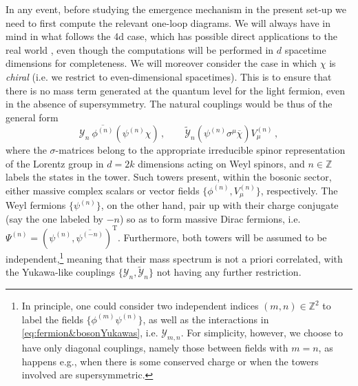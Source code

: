 In any event, before studying the emergence mechanism in the present set-up we need to first compute the relevant one-loop diagrams. We will always have in mind in what follows the 4d case, which has possible direct applications to the real world \cite{Castellano:2023qhp}, even though the computations will be performed in $d$ spacetime dimensions for completeness. We will moreover consider the case in which $\chi$ is \emph{chiral} (i.e. we restrict to even-dimensional spacetimes). This is to ensure that there is no mass term generated at the quantum level for the light fermion, even in the absence of supersymmetry. The natural couplings would be thus of the general form
%
\begin{equation}\label{eq:fermion&bosonYukawas}
		\mathcal{Y}_n\ \overline{\phi^{(n)}} \left(\psi^{(n)}\chi \right)\, , \qquad  \tilde{\mathcal{Y}}_n \left(\psi^{(n)} \sigma^{\mu} \overline \chi \right) V_{\mu}^{(n)}\, ,   
\end{equation}
%
where the $\sigma$-matrices belong to the appropriate irreducible spinor representation of the Lorentz group in $d=2k$ dimensions acting on Weyl spinors, and $n \in \mathbb{Z}$ labels the states in the tower. Such towers present, within the bosonic sector, either massive complex scalars or vector fields $\{\phi^{(n)}, V_{\mu}^{(n)} \}$, respectively. The Weyl fermions $\{\psi^{(n)}\}$, on the other hand, pair up with their charge conjugate (say the one labeled by $-n$) so as to form massive Dirac fermions, i.e. $\Psi^{(n)}=\left(\psi^{(n)}, \overline{\psi^{(-n)}} \right)^{\text{T}}$. Furthermore, both towers will be assumed to be independent,\footnote{In principle, one could consider two  independent  indices $(m, n) \in \mathbb{Z}^2$ to label the fields $\lbrace \phi^{(m)} \psi^{(n)} \rbrace$, as well as the interactions in \eqref{eq:fermion&bosonYukawas}, i.e. $\mathcal{Y}_{m, n}$. For simplicity, however, we choose to have only diagonal couplings, namely those between fields with $m=n$, as happens e.g., when there is some conserved charge or when the towers involved are supersymmetric.} meaning that their mass spectrum is not a priori correlated, with the Yukawa-like couplings $\lbrace \mathcal{Y}_n, \tilde{\mathcal{Y}}_n \rbrace$ not having any further restriction.
	
